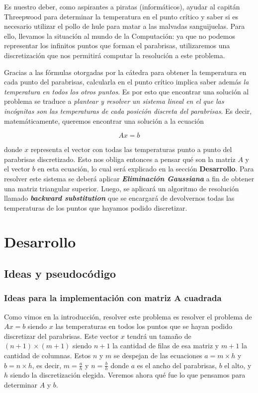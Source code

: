 \vspace{\baselineskip}
\par 
Es nuestro deber, como aspirantes a piratas (informáticos), ayudar al capitán Threepwood para determinar la temperatura en el punto crítico y saber si es necesario utilizar el pollo de hule para matar a las malvadas sanguijuelas. Para ello, llevamos la situación al mundo de la Computación: ya que no podemos representar los infinitos puntos que forman el parabrisas, utilizaremos una discretización que nos permitirá computar la resolución a este problema. 
\par
Gracias a las fórmulas otorgadas por la cátedra para obtener la temperatura en cada punto del parabrisas, calcularla en el punto crítico implica saber además \textit{la temperatura en todos los otros puntos}. Es por esto que encontrar una solución al problema se traduce a \textit{plantear y resolver un sistema lineal en el que las incógnitas son las temperaturas de cada posición discreta del parabrisas}. Es decir, matemáticamente, queremos encontrar una solución a la ecuación

\[ Ax = b \]

donde $x$ representa el vector con todas las temperaturas punto a punto del parabrisas discretizado. Esto nos obliga entonces a pensar qué son la matriz $A$ y el vector $b$ en esta ecuación, lo cual será explicado en la sección \textbf{Desarrollo}. Para resolver este sistema se deberá aplicar \textbf{\textit{Eliminación Gaussiana}} a fin de obtener una matriz triangular superior. Luego, se aplicará un algoritmo de resolución llamado \textbf{\textit{backward substitution}} que se encargará de devolvernos todas las temperaturas de los puntos que hayamos podido discretizar.

\section{Desarrollo}

\subsection{Ideas y pseudocódigo}

\subsubsection{Ideas para la implementación con matriz A cuadrada}

Como vimos en la introducción, resolver este problema es resolver el problema de $Ax = b$ siendo $x$ las temperaturas en todos los puntos que se hayan podido discretizar del parabrisas. Este vector $x$ tendrá un tamaño de $(n+1) \times (m+1)$ siendo $n+1$ la cantidad de filas de esa matriz y $m+1$ la cantidad de columnas. Estos $n$ y $m$ se despejan de las ecuaciones $a = m \times h$ y $b = n \times h$, es decir, $m = \frac{a}{h}$ y $n = \frac{b}{h}$ donde $a$ es el ancho del parabrisas, $b$ el alto, y $h$ siendo la discretización elegida. Veremos ahora qué fue lo que pensamos para determinar $A$ y $b$.

